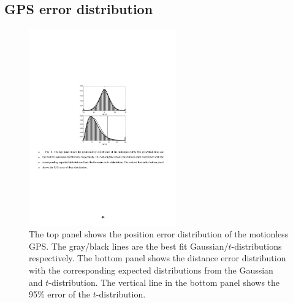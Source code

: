 \documentclass{ametsoc}
\begin{document}

%
\subsection{GPS error distribution}
\label{subsec:gps_position_errors}
%

\begin{figure}
\centerline{\includegraphics[width=15pc,angle=0]{gps_error.pdf}} 
  \caption{The top panel shows the position error distribution of the motionless GPS. The gray/black lines are the best fit Gaussian/$t$-distributions respectively. The bottom panel shows the distance error distribution with the corresponding expected distributions from the Gaussian and $t$-distribution. The vertical line in the bottom panel shows the 95\% error of the $t$-distribution.}
  \label{motionless_error}
\end{figure}
\end{document}
